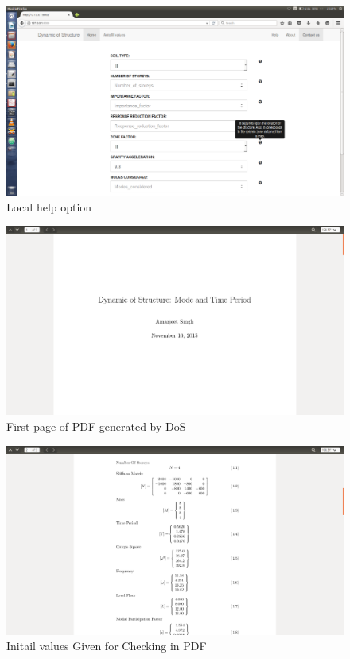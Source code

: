 \begin{figure}[H]
\centering \includegraphics[scale=0.31]{images/output/4.png}
\caption{Local help option}
\end{figure}
\newpage
\begin{figure}[H]
\centering \includegraphics[scale=0.31]{images/output/6.png}
\caption{First page of PDF generated by DoS}
\end{figure}
\begin{figure}[H]
\centering \includegraphics[scale=0.31]{images/output/7.png}
\caption{Initail values Given for Checking in PDF}
\end{figure}
